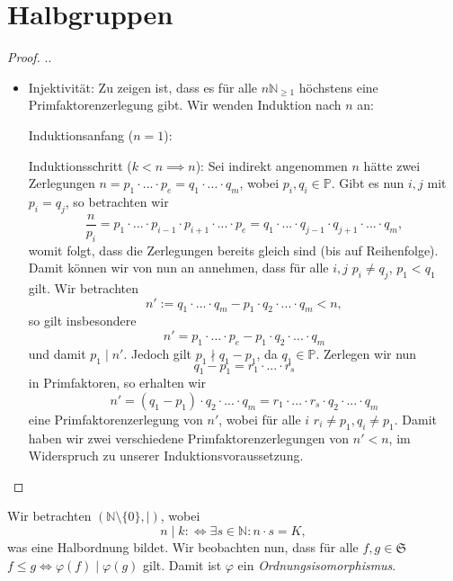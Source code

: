 \section{Halbgruppen}

\begin{theorem}

\end{theorem}

\begin{proof}
    ..
    \begin{itemize}
        \item Injektivität: Zu zeigen ist, dass es für alle $n \mathbb{N}_{\geq 1}$ höchstens eine Primfaktorenzerlegung gibt. Wir wenden Induktion nach $n$ an:
        
        Induktionsanfang ($n=1$):

        Induktionsschritt ($k<n \implies n$): Sei indirekt angenommen $n$ hätte zwei Zerlegungen $n = p_1 \cdot ... \cdot p_e = q_1 \cdot ... \cdot q_m$, wobei $p_i, q_i \in \mathbb{P}$. Gibt es nun $i,j$ mit $p_i = q_j$, so betrachten wir
        $$ \frac{n}{p_i} = p_1 \cdot ... \cdot p_{i-1} \cdot p_{i+1} \cdot ... \cdot p_e = q_1 \cdot ... \cdot q_{j-1} \cdot q_{j+1} \cdot ... \cdot q_m, $$
        womit folgt, dass die Zerlegungen bereits gleich sind (bis auf Reihenfolge). Damit können wir von nun an annehmen, dass für alle $i, j$ $p_i \neq q_j$, \obda $p_1 < q_1$ gilt. Wir betrachten
        $$ n' := q_1 \cdot ... \cdot q_m - p_1 \cdot q_2 \cdot ... \cdot q_m < n, $$
        so gilt insbesondere
        $$ n' = p_1 \cdot ... \cdot p_e - p_1 \cdot q_2 \cdot ... \cdot q_m $$
        und damit $p_1 \mid n'$. Jedoch gilt $p_1 \nmid q_1 - p_1$, da $q_1 \in \mathbb{P}$. Zerlegen wir nun
        $$ q_1 - p_1 = r_1 \cdot ... \cdot r_s $$
        in Primfaktoren, so erhalten wir
        $$ n' = (q_1 - p_1) \cdot q_2 \cdot ... \cdot q_m = r_1 \cdot ... \cdot r_s \cdot q_2 \cdot ... \cdot q_m $$
        eine Primfaktorenzerlegung von $n'$, wobei für alle $i$ $r_i \neq p_1, q_i \neq p_1$. Damit haben wir zwei verschiedene Primfaktorenzerlegungen von $n' < n$, im Widerspruch zu unserer Induktionsvoraussetzung.
    \end{itemize}
\end{proof}

\begin{remark}
    Wir betrachten $(\mathbb{N} \setminus \{ 0 \}, \mid)$, wobei
    $$ n \mid k :\Leftrightarrow \exists s \in \mathbb{N}: n \cdot s = K, $$
    was eine Halbordnung bildet. Wir beobachten nun, dass für alle $f,g \in \mathfrak{S}$ $f \leq g \Leftrightarrow \varphi(f) \mid \varphi(g)$ gilt. Damit ist $\varphi$ ein \emph{Ordnungsisomorphismus}.
\end{remark}

